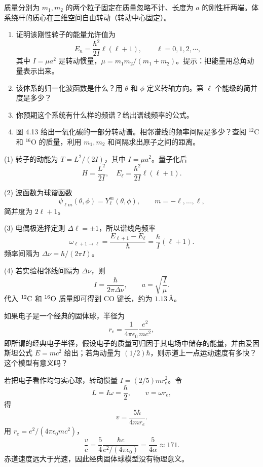 \begin{question}
质量分别为 $m_1,m_2$ 的两个粒子固定在质量忽略不计、长度为 $a$ 的刚性杆两端。体系绕杆的质心在三维空间自由转动（转动中心固定）。
\begin{enumerate}
\item 证明该刚性转子的能量允许值为
\[
E_n=\frac{\hbar^2}{2I}\ell(\ell+1),\qquad \ell=0,1,2,\cdots,
\]
其中 $I=\mu a^2$ 是转动惯量，$\mu=m_1m_2/(m_1+m_2)$。提示：把能量用总角动量表示出来。
\item 该体系的归一化波函数是什么？用 $\theta$ 和 $\phi$ 定义转轴方向。第 $\ell$ 个能级的简并度是多少？
\item 你预期这个系统有什么样的频谱？给出谱线频率的公式。
\item 图 4.13 给出一氧化碳的一部分转动谱。相邻谱线的频率间隔是多少？查阅 ${}^{12}\mathrm C$ 和 ${}^{16}\mathrm O$ 的质量，利用 $m_1,m_2$ 和间隔求出原子之间的距离。
\end{enumerate}
\end{question}
\begin{solution}

(1) 转子的动能为 $T=L^2/(2I)$，其中 $I=\mu a^2$。量子化后
\[
H=\frac{L^2}{2I},
\quad
E_\ell=\frac{\hbar^2}{2I}\ell(\ell+1).
\]

(2) 波函数为球谐函数
\[
\psi_{\ell m}(\theta,\phi)=Y_\ell^m(\theta,
\phi),\qquad m=-\ell,\ldots,\ell,
\]
简并度为 $2\ell+1$。

(3) 电偶极选择定则 $\Delta\ell=\pm1$，所以谱线角频率
\[
\omega_{\ell+1\to\ell}=\frac{E_{\ell+1}-E_\ell}{\hbar}=\frac{\hbar}{I}(\ell+1).
\]
频率间隔为 $\Delta \nu=\hbar/(2\pi I)$。

(4) 若实验相邻线间隔为 $\Delta\nu$，则
\[
I=\frac{\hbar}{2\pi\Delta\nu},
\qquad
 a=\sqrt{\frac{I}{\mu}}.
\]
代入 ${}^{12}{\rm C}$ 和 ${}^{16}{\rm O}$ 质量即可得到 CO 键长，约为 $1.13\,\text{\AA}$。

\end{solution}

\begin{question}
如果电子是一个经典的固体球，半径为
\[
r_e=\frac{1}{4\pi\epsilon_0}\frac{e^2}{mc^2},
\]
即所谓的经典电子半径，假设电子的质量可归因于其电场中储存的能量，并由爱因斯坦公式 $E=mc^2$ 给出；若角动量为 $(1/2)\hbar$，则赤道上一点运动速度有多快？这个模型有意义吗？
\end{question}
\begin{solution}

若把电子看作均匀实心球，转动惯量 $I=(2/5)mr_e^2$。令
\[
L=I\omega=\frac{\hbar}{2},
\qquad v=\omega r_e,
\]
得
\[
v=\frac{5\hbar}{4mr_e}.
\]
用 $r_e=e^2/(4\pi\epsilon_0mc^2)$，
\[
\frac{v}{c}=\frac{5}{4}\frac{\hbar c}{e^2/(4\pi\epsilon_0)}=\frac{5}{4\alpha}\approx171.
\]
赤道速度远大于光速，因此经典固体球模型没有物理意义。

\end{solution}

